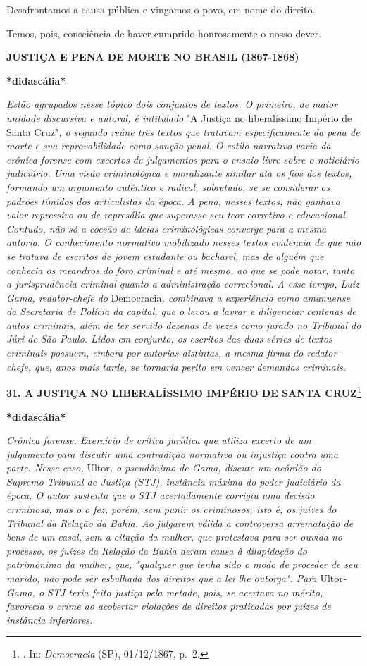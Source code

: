 Desafrontamos a causa pública e vingamos o povo, em nome do direito.

Temos, pois, consciência de haver cumprido honrosamente o nosso dever.

\textbf{JUSTIÇA E PENA DE MORTE NO BRASIL (1867-1868)}

\textbf{*didascália*}

\emph{Estão agrupados nesse tópico dois conjuntos de textos. O primeiro,
de maior unidade discursiva e autoral, é intitulado} "A Justiça no
liberalíssimo Império de Santa Cruz"\emph{, o segundo reúne três textos
que tratavam especificamente da pena de morte e sua reprovabilidade como
sanção penal. O estilo narrativo varia da crônica forense com excertos
de julgamentos para o ensaio livre sobre o noticiário judiciário. Uma
visão criminológica e moralizante similar ata os fios dos textos,
formando um argumento autêntico e radical, sobretudo, se se considerar
os padrões tímidos dos articulistas da época. A pena, nesses textos, não
ganhava valor repressivo ou de represália que superasse seu teor
corretivo e educacional. Contudo, não só a coesão de ideias
criminológicas converge para a mesma autoria. O conhecimento normativo
mobilizado nesses textos evidencia de que não se tratava de escritos de
jovem estudante ou bacharel, mas de alguém que conhecia os meandros do
foro criminal e até mesmo, ao que se pode notar, tanto a jurisprudência
criminal quanto a administração correcional. A esse tempo, Luiz Gama,
redator-chefe do} Democracia\emph{, combinava a experiência como
amanuense da Secretaria de Polícia da capital, que o levou a lavrar e
diligenciar centenas de autos criminais, além de ter servido dezenas de
vezes como jurado no Tribunal do Júri de São Paulo. Lidos em conjunto,
os escritos das duas séries de textos criminais possuem, embora por
autorias distintas, a mesma firma do redator-chefe, que, anos mais
tarde, se tornaria perito em vencer demandas criminais.}

\textbf{31. A JUSTIÇA NO LIBERALÍSSIMO IMPÉRIO DE SANTA CRUZ}\footnote{.
  In: \emph{Democracia} (SP), 01/12/1867, p.~2.}

\textbf{*didascália*}

\emph{Crônica forense. Exercício de crítica jurídica que utiliza excerto
de um julgamento para discutir uma contradição normativa ou injustiça
contra uma parte. Nesse caso,} Ultor\emph{, o pseudônimo de Gama,
discute um acórdão do Supremo Tribunal de Justiça (STJ), instância
máxima do poder judiciário da época. O autor sustenta que o STJ
acertadamente corrigiu uma decisão criminosa, mas o o fez, porém, sem
punir os criminosos, isto é, os juízes do Tribunal da Relação da Bahia.
Ao julgarem válida a controversa arrematação de bens de um casal, sem a
citação da mulher, que protestava para ser ouvida no processo, os juízes
da Relação da Bahia deram causa à dilapidação do patrimônimo da mulher,
que, "qualquer que tenha sido o modo de proceder de seu marido, não pode
ser esbulhada dos direitos que a lei lhe outorga". Para}
Ultor\emph{-Gama, o STJ teria feito justiça pela metade, pois, se
acertava no mérito, favorecia o crime ao acobertar violações de direitos
praticadas por juízes de instância inferiores.}

